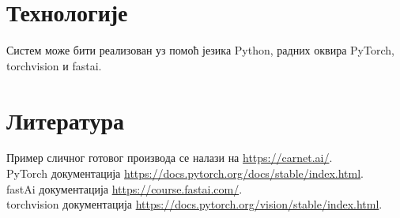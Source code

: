 \documentclass{article}
\begin{document}
  \section{Технологије}
  Систем може бити реализован уз помоћ језика Python, радних оквира PyTorch, torchvision и fastai.
  \section{Литература}
  Пример сличног готовог производа се налази на \url{https://carnet.ai/}. \\
  PyTorch документација \url{https://docs.pytorch.org/docs/stable/index.html}. \\
  fastAi документација \url{https://course.fastai.com/}. \\
  torchvision документација \url{https://docs.pytorch.org/vision/stable/index.html}. \\
\end{document}
